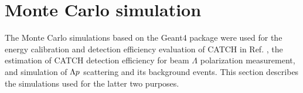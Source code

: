 \begin{comment}
Case \rom{1} without $\pM$ mode assumes that the CATCH system detected $\pM$ from the $\kzdecay$ decay, recoil proton from the $\Lp$ scattering, and decay proton from the $\scatldecay$ decay. Since scattered $\Lambda$ can not reconstructed without decay $\pM$, the $\Delta E$ method is only available in this mode. In contrast, case \rom{1} with $\pM$ mode assumes that the CATCH system detected all final state particles: $\pM$ from the $\kzdecay$ decay, recoil proton from the $\Lp$ scattering, decay $\pM$, and decay proton from the $\scatldecay$ decay. $\Delta E$ and $\Delta p$ methods are available in this mode.

\end{comment}


\clearpage
\section{Monte Carlo simulation}
\label{sec-simulation}

The Monte Carlo simulations based on the Geant4 package \cite{G4} were used for the energy calibration and detection efficiency evaluation of CATCH in Ref. \cite{Miwa-SMp}, the estimation of CATCH detection efficiency for beam $\Lambda$ polarization measurement, and simulation of $\Lambda p$ scattering and its background events. This section describes the simulations used for the latter two purposes.

